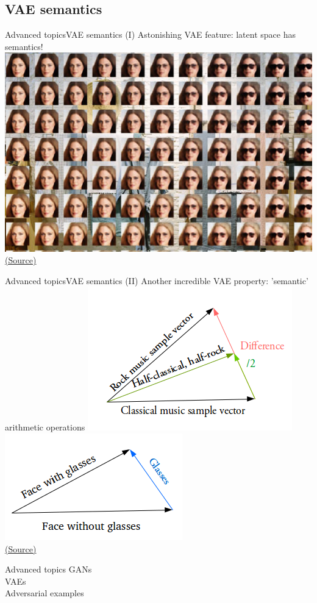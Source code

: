 \documentclass[10pt,compress]{beamer} %
\begin{document}
\subsection{VAE semantics}

\begin{frame}{Advanced topics}{VAE semantics (I)}
	Astonishing VAE feature: latent space has semantics!
	\centering\includegraphics[width=0.7\linewidth]{figs/faces.jpg}\\
	\scriptsize\href{https://www.compthree.com/blog/autoencoder/}{(Source)}

\end{frame}

\begin{frame}{Advanced topics}{VAE semantics (II)}
	Another incredible VAE property: 'semantic' arithmetic operations
	\centering\includegraphics[width=0.3\linewidth]{figs/vector-vae1.png}\quad
	\centering\includegraphics[width=0.3\linewidth]{figs/vector-vae2.png}\\
	\scriptsize\href{https://towardsdatascience.com/intuitively-understanding-variational-autoencoders-1bfe67eb5daf}{(Source)}
\end{frame}

\begin{frame}{Advanced topics}
    GANs\\
    VAEs\\
    Adversarial examples
\end{frame}
\end{document}
